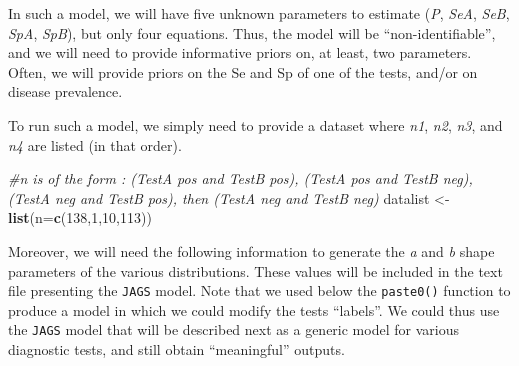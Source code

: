 \documentclass[
]{book}
\newenvironment{Shaded}{\begin{snugshade}}{\end{snugshade}}
\newcommand{\AttributeTok}[1]{\textcolor[rgb]{0.13,0.29,0.53}{#1}}
\newcommand{\CommentTok}[1]{\textcolor[rgb]{0.56,0.35,0.01}{\textit{#1}}}
\newcommand{\DecValTok}[1]{\textcolor[rgb]{0.00,0.00,0.81}{#1}}
\newcommand{\FunctionTok}[1]{\textcolor[rgb]{0.13,0.29,0.53}{\textbf{#1}}}
\newcommand{\NormalTok}[1]{#1}
\newcommand{\OtherTok}[1]{\textcolor[rgb]{0.56,0.35,0.01}{#1}}
\begin{document}
In such a model, we will have five unknown parameters to estimate (\emph{P}, \emph{SeA}, \emph{SeB}, \emph{SpA}, \emph{SpB}), but only four equations. Thus, the model will be ``non-identifiable'', and we will need to provide informative priors on, at least, two parameters. Often, we will provide priors on the Se and Sp of one of the tests, and/or on disease prevalence.

To run such a model, we simply need to provide a dataset where \emph{n1}, \emph{n2}, \emph{n3}, and \emph{n4} are listed (in that order).

\begin{Shaded}
\begin{Highlighting}[]
\CommentTok{\#n is of the form : (TestA pos and TestB pos), (TestA pos and TestB neg), (TestA neg and TestB pos), then (TestA neg and TestB neg)}
\NormalTok{datalist }\OtherTok{\textless{}{-}} \FunctionTok{list}\NormalTok{(}\AttributeTok{n=}\FunctionTok{c}\NormalTok{(}\DecValTok{138}\NormalTok{,}\DecValTok{1}\NormalTok{,}\DecValTok{10}\NormalTok{,}\DecValTok{113}\NormalTok{))}
\end{Highlighting}
\end{Shaded}

Moreover, we will need the following information to generate the \emph{a} and \emph{b} shape parameters of the various distributions. These values will be included in the text file presenting the \texttt{JAGS} model. Note that we used below the \texttt{paste0()} function to produce a model in which we could modify the tests ``labels''. We could thus use the \texttt{JAGS} model that will be described next as a generic model for various diagnostic tests, and still obtain ``meaningful'' outputs.
\end{document}
